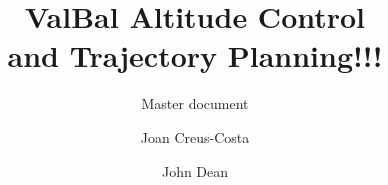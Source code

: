 \documentclass[11pt]{scrartcl} %
\title{\bfseries ValBal Altitude Control\\ and Trajectory Planning!!!}
\subtitle{\Large Master document} %
\author{Joan Creus-Costa\and John Dean}
\begin{document}
\maketitle

\def\States{\mathcal{S}}
\def\Altitudes{\mathcal{H}}
\def\Velocities{\mathcal{V}}
\def\Lifts{\mathcal{L}}

\newcommand{\R}{\mathbb{R}}
\newcommand*{\vertbar}{\rule[-1ex]{0.5pt}{2.5ex}}
\newcommand*{\horzbar}{\rule[.5ex]{2.5ex}{0.5pt}}
\newcommand{\probs}[3]{\paragraph{Problem #1} \textit{#2}
\begin{description}[labelwidth=.7cm,labelindent=0cm,leftmargin=0.9cm,align=left]
#3
\end{description}
}
\newcommand{\prob}[3]{\paragraph{Problem #1} \textit{#2}{#3}}
\newcommand{\prt}[1]{\subsection*{(#1)}}
\newcommand{\n}[1]{\mathrm{#1}}
\newcommand{\nb}[1]{\mathrm{\textbf{#1}}}
\newcommand{\mx}[2]{\left[ \begin{array}{#1} #2 \end{array} \right]}
\newcommand{\ig}[2]{\begin{center}\texttt{[image: \#2]}\end{center}}
\newcommand{\ls}[1]{\begin{lstlisting} #1 \end{lstlisting}} 
\newcommand{\conv}[1]{\mathrm{\textbf{conv}}\{ #1 \}}
\newcommand{\headfoot}[3]{
\pagestyle{fancy}
\lhead{#1}
\chead{#2}
\rhead{#3}
\lfoot{}
\cfoot{\thepage}
\rfoot{}
}

\newcommand{\ones}{\mathbf 1}
\newcommand{\reals}{{\mbox{\bf R}}}
\newcommand{\integers}{{\mbox{\bf Z}}}
\newcommand{\symm}{{\mbox{\bf S}}}  %

\newcommand{\nullspace}{{\mathcal N}}
\newcommand{\range}{{\mathcal R}}
\newcommand{\Rank}{\mathop{\bf Rank}}
\newcommand{\Tr}{\mathop{\bf Tr}}
\newcommand{\diag}{\mathop{\bf diag}}
\newcommand{\card}{\mathop{\bf card}}
\newcommand{\rank}{\mathop{\bf rank}}
\newcommand{\prox}{\mathbf{prox}}

\newcommand{\Expect}{\mathop{\bf E{}}}
\newcommand{\Prob}{\mathop{\bf Prob}}
\newcommand{\Co}{{\mathop {\bf Co}}} %
\newcommand{\dist}{\mathop{\bf dist{}}}
\newcommand{\argmin}{\mathop{\rm argmin}}
\newcommand{\argmax}{\mathop{\rm argmax}}
\newcommand{\epi}{\mathop{\bf epi}} %
\newcommand{\Vol}{\mathop{\bf vol}}
\newcommand{\dom}{\mathop{\bf dom}} %
\newcommand{\intr}{\mathop{\bf int}}
\newcommand{\sign}{\mathop{\bf sign}}
\end{document}

